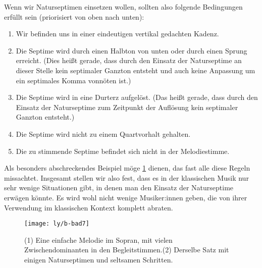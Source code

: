 Wenn wir Naturseptimen einsetzen wollen, sollten also folgende Bedingungen
erfüllt sein (priorisiert von oben nach unten):

\begin{enumerate}
\item Wir befinden uns in einer eindeutigen vertikal gedachten Kadenz.
\item Die Septime wird durch einen Halbton von unten oder durch einen Sprung
  erreicht. (Dies heißt gerade, dass durch den Einsatz
  der Naturseptime an dieser Stelle kein septimaler Ganzton entsteht und auch
  keine Anpassung um ein septimales Komma vonnöten ist.)
\item Die Septime wird in eine Durterz aufgelöst. (Das heißt gerade, dass durch
  den Einsatz der Naturseptime zum Zeitpunkt der Auflösung kein septimaler
  Ganzton entsteht.)
\item Die Septime wird nicht zu einem Quartvorhalt gehalten.
\item Die zu stimmende Septime befindet sich nicht in der Melodiestimme.
\end{enumerate}
%
Als besonders abschreckendes Beispiel möge \cref{fig:bad7} dienen, das fast alle
diese Regeln missachtet. Insgesamt stellen wir also fest, dass es in der
klassischen Musik nur sehr wenige Situationen gibt, in denen man den Einsatz der
Naturseptime erwägen könnte.  Es wird wohl nicht wenige Musiker:innen geben, die
von ihrer Verwendung im klassischen Kontext komplett abraten.

\begin{figure}
  \centering
  \texttt{[image: ly/b-bad7]}
  \caption{(1) Eine einfache Melodie im Sopran, mit vielen Zwischendominanten in
    den Begleitstimmen.\quad (2) Derselbe Satz mit einigen
    Naturseptimen und seltsamen Schritten.}\label{fig:bad7}
\end{figure}

